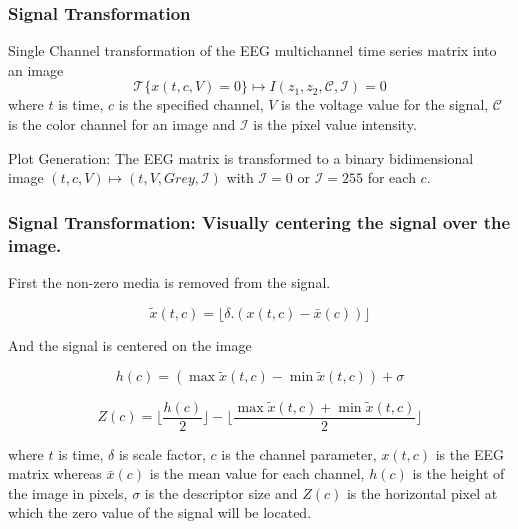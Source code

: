\documentclass[aspectratio=169]{beamer}
\begin{document}
    
    \begin{frame}
        \frametitle{Signal Transformation}
        \begin{center}           

Single Channel transformation of the EEG multichannel time series matrix into an image
\begin{equation}
\mathscr{T}\{x(t,c,V)=0\} \mapsto I(z_1,z_2, \mathcal{C}, \mathcal{I}) = 0
\end{equation}
where $ t $ is time, $ c $ is the specified channel, $ V $ is the voltage value for the signal, $ \mathcal{C} $ is the color channel for an image and  $ \mathcal{I} $ is the pixel value intensity.

\vspace{17pt}

Plot Generation: The EEG matrix is transformed to a binary bidimensional image $ (t,c,V) \mapsto (t, V, Grey, \mathcal{I}) $ with $\mathcal{I} = 0$ or  $\mathcal{I} = 255$ for each $ c $.

		\end{center}
	\end{frame}
	
	\begin{frame}
	\frametitle{Signal Transformation: Visually centering the signal over the image.}
	\begin{center}

First the non-zero media is removed from the signal.
	
\begin{equation}
\tilde{x}(t,c) = \lfloor  \delta .(  x(t,c) - \bar{x}(c)  )   \rfloor 
\end{equation}
	
And the signal is centered on the image

\begin{equation}
h(c) = ( \max{} \tilde{x}(t,c) - \min{} \tilde{x}(t,c) ) + \sigma 
\end{equation}

\begin{equation}
Z(c) = \lfloor \frac{h(c)}{2} \rfloor - \lfloor \frac{\max{} \tilde{x}(t,c) + \min{} \tilde{x}(t,c)}{2} \rfloor 
\end{equation}

where $ t $ is time, $ \delta $ is scale factor,  $ c $ is the channel parameter, $ x(t,c) $ is the EEG matrix whereas $ \bar{x}(c) $ is the mean value for each channel,  $ h(c) $ is the height of the image in pixels, $ \sigma $ is the descriptor size and $ Z(c) $ is the horizontal pixel at which the zero value of the signal will be located.

	\end{center}
	\end{frame}
\end{document}
